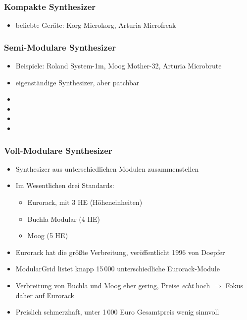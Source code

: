 \documentclass[11pt,ngerman]{beamer}
\begin{document}
 
\begin{frame}
\frametitle{Kompakte Synthesizer}

\begin{itemize}
\item beliebte Geräte: Korg Microkorg, Arturia Microfreak
\end{itemize}
\end{frame}
 
 
 \begin{frame}
 \frametitle{Semi-Modulare Synthesizer}
  
 \begin{itemize}
 \item Beispiele: Roland System-1m, Moog Mother-32, Arturia Microbrute
 \item eigenständige Synthesizer, aber patchbar 
 \item 
 \item 
 \item 
 \item 
 \end{itemize}
 \end{frame}
 
 
 
 
\begin{frame}
\frametitle{Voll-Modulare Synthesizer}

\begin{itemize}
\item Synthesizer aus unterschiedlichen Modulen zusammenstellen
\item Im Wesentlichen drei Standards:

\begin{itemize}
	\item Eurorack, mit 3 HE (Höheneinheiten)
	\item Buchla Modular (4 HE)
	\item Moog (5 HE)
\end{itemize}
\item Eurorack hat die größte Verbreitung, veröffentlicht 1996 von Doepfer
\item ModularGrid listet knapp 15\,000 unterschiedliche Eurorack-Module
\item Verbreitung von Buchla und Moog eher gering, Preise \textit{echt} hoch $\Rightarrow$ Fokus daher auf Eurorack
\item Preislich schmerzhaft, unter 1\,000 Euro Gesamtpreis wenig sinnvoll
\end{itemize}
\end{frame} 
\end{document}
